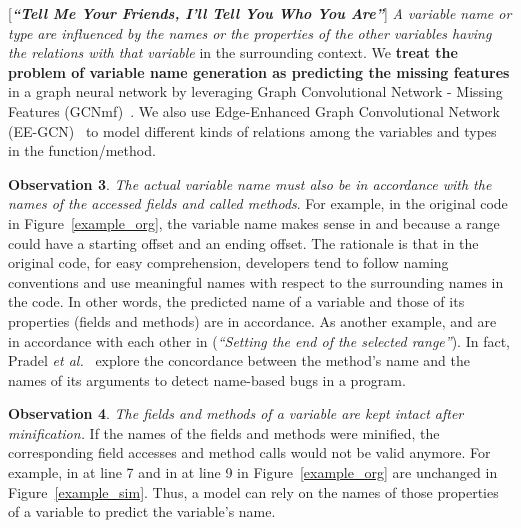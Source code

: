 \vspace{2pt}
 [{\bf {\em ``Tell Me Your Friends, I'll Tell
    You Who You Are''}}]
          {\em A variable name or type are influenced by the
  names or the properties of the other variables having the relations
  with that variable} in the surrounding context. We {\bf treat the
  problem of variable name generation as predicting the missing
  features} in a graph neural network by leveraging Graph Convolutional
Network - Missing Features (GCNmf)~\cite{GCNmf}.  We also use
Edge-Enhanced Graph Convolutional Network (EE-GCN)~\cite{ee-gcn} to
model different kinds of relations among the
variables and types in the function/method.



\vspace{2pt} \textbf{Observation 3}. {\em The actual variable name
  must also be in accordance with the names of the accessed fields and
  called methods}. For example, in the original code in
Figure~\ref{example_org}, the variable name  makes sense
in  and  because a
range could have a starting offset and an ending offset. The rationale
is that in the original code, for easy comprehension, developers tend
to follow naming conventions and use meaningful names with respect to the
surrounding names in the code. In other words, the predicted name of a
variable and those of its properties (fields and methods) are in
accordance. As another example,  and
 are in accordance with each other in
 ({\em ``Setting the end of the
  selected range''}). In fact, Pradel {\em et
  al.}~\cite{deepbugs-oopsla18} explore the concordance between the
method's name and the names of its arguments to detect name-based bugs
in a program.


\vspace{2pt}
\textbf{Observation 4}. {\em The fields and methods of a variable are
  kept intact after minification.} If the names of the fields and
methods were minified, the corresponding field accesses and method
calls would not be valid anymore. For example,  in
 at line 7 and  in
 at line 9 in Figure~\ref{example_org} are
unchanged in Figure~\ref{example_sim}. Thus, a model can rely
on the names of those properties of a variable to predict the
variable's name.

